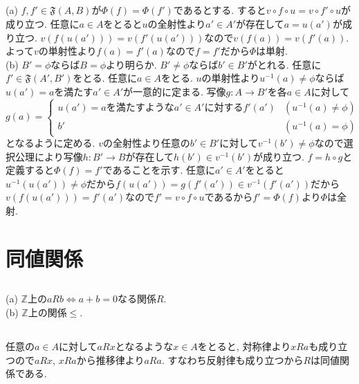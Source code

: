 \documentclass{jsarticle}
\begin{document}
\subsection{} %
(a) $f, f' \in \mathfrak{F}(A, B)$が$\Phi(f) = \Phi(f')$であるとする. すると$v \circ f \circ u = v \circ f' \circ u$が成り立つ. 任意に$a \in A$をとると$u$の全射性より$a' \in A'$が存在して$a = u(a')$が成り立つ. $v(f(u(a'))) = v(f'(u(a')))$なので$v(f(a)) = v(f'(a))$. よって$v$の単射性より$f(a) = f'(a)$なので$f = f'$だから$\Phi$は単射.\\
(b) $B' = \phi$ならば$B = \phi$より明らか. $B' \neq \phi$ならば$b' \in B'$がとれる. 任意に$f' \in \mathfrak{F}(A', B')$をとる. 任意に$a \in A$をとる. $u$の単射性より$u^{-1}(a) \neq \phi$ならば$u(a') = a$を満たす$a' \in A'$が一意的に定まる. 写像$g:A \rightarrow B'$を各$a \in A$に対して
\begin{equation*}
	g(a) =
	\begin{cases}
		u(a') = aを満たすようなa' \in A'に対するf'(a') & (u^{-1}(a) \neq \phi)\\
		b' & (u^{-1}(a) = \phi)
	\end{cases}
\end{equation*}
となるように定める. $v$の全射性より任意の$b' \in B'$に対して$v^{-1}(b') \neq \phi$なので選択公理により写像$h:B' \rightarrow B$が存在して$h(b') \in v^{-1}(b')$が成り立つ. $f = h \circ g$と定義すると$\Phi(f) = f'$であることを示す. 任意に$a' \in A'$をとると$u^{-1}(u(a')) \neq \phi$だから$f(u(a')) = g(f'(a')) \in v^{-1}(f'(a'))$だから$v(f(u(a'))) = f'(a')$なので$f' = v \circ f \circ u$であるから$f' = \Phi(f)$より$\Phi$は全射.


\section{同値関係} %
\subsection{} %
\noindent
(a) $\mathbb{Z}$上の$aRb \Leftrightarrow a + b = 0$なる関係$R$.\\
(b) $\mathbb{Z}$上の関係$\leq$.

\subsection{} %
任意の$a \in A$に対して$aRx$となるような$x \in A$をとると, 対称律より$xRa$も成り立つので$aRx$, $xRa$から推移律より$aRa$. すなわち反射律も成り立つから$R$は同値関係である.
\end{document}
